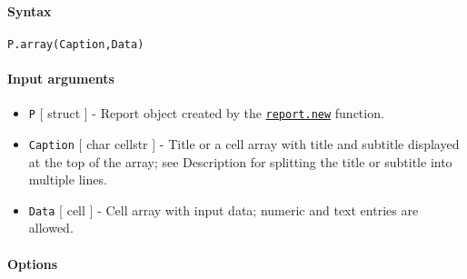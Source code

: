 


	\paragraph{Syntax}

\begin{verbatim}
P.array(Caption,Data)
\end{verbatim}

\paragraph{Input arguments}

\begin{itemize}
\item
  \texttt{P} {[} struct {]} - Report object created by the
  \href{report/new}{\texttt{report.new}} function.
\item
  \texttt{Caption} {[} char \textbar{} cellstr {]} - Title or a cell
  array with title and subtitle displayed at the top of the array; see
  Description for splitting the title or subtitle into multiple lines.
\item
  \texttt{Data} {[} cell {]} - Cell array with input data; numeric and
  text entries are allowed.
\end{itemize}

\paragraph{Options}

